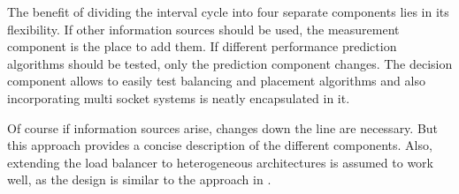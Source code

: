 The benefit of dividing the interval cycle into four separate components lies
in its flexibility.
If other information sources should be used, the measurement component is the
place to add them.
If different performance prediction algorithms should be tested, only the
prediction component changes.
The decision component allows to easily test balancing and placement algorithms
and also incorporating multi socket systems is neatly encapsulated in it.

Of course if information sources arise, changes down the line are necessary.
But this approach provides a concise description of the different components.
Also, extending the load balancer to heterogeneous architectures is assumed to
work well, as the design is similar to the approach in
\cite{sarma_smartbalance_2015}.


\begin{comment}

\paragraph{Topology description}
Represents the cache and core layout of the CPU.
On Haswell it consist of a package description containing core descriptions.
A core description consists of the hardware assigned APIC\_id, the kernel
assigned fiasco\_id, and the SMT abstraction.
It can be expanded to include multi-socket systems by adding more package
descriptions.
It maps the fiasco view on the cores onto the actual HW topology and uses CPUID
to determine corresponding logical cores.

\paragraph{Thread\_t}
is the administrative representation of a L4-thread.
It contains not only of the thread parameters passed via run\_thread(), but
also measurements for the current and last interval.
LLC-misses, execution time, an identifier, and the cores it currently runs on
and will run on in the next interval.

\end{comment}
